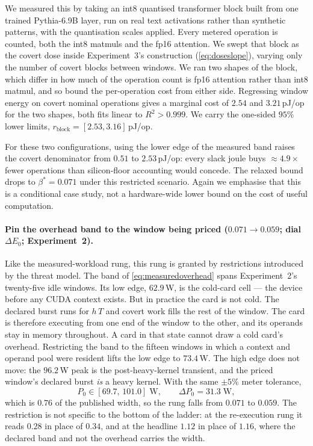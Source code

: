 \documentclass{article}
\theoremstyle{plain}
\theoremstyle{definition}
\theoremstyle{remark}
\begin{document}
We measured this by taking an int8 quantised transformer block built from one trained Pythia-6.9B
layer, run on real text activations rather than synthetic
patterns, with the quantisation scales applied. Every metered operation is
counted, both the int8 matmuls and the fp16 attention. We swept that block
as the covert dose inside Experiment~3's construction
(\cref{eq:doseslope}), varying only the number of covert blocks between
windows. We ran two shapes of the block, which differ in how much of the
operation count is fp16 attention rather than int8 matmul, and so bound the
per-operation cost from either side. Regressing window energy on covert nominal
operations gives a marginal cost of $2.54$ and $3.21$\,pJ/op for the two
shapes, both fits linear to $R^{2} > 0.999$. We carry the one-sided $95\%$ lower limits,
$r_{\mathrm{block}} = [2.53, 3.16]$\,pJ/op.

For these two configurations, using the lower edge of the measured band raises
the covert denominator from $0.51$ to $2.53$\,pJ/op: every slack joule buys
${\approx}4.9\times$ fewer operations than silicon-floor accounting would
concede. The relaxed bound drops to $\beta^{*} = 0.071$ under this restricted
scenario. Again we emphasise that this is a conditional case study, not a hardware-wide lower bound on
the cost of useful computation.

\paragraph{Pin the overhead band to the window being priced
($0.071 \to 0.059$; dial $\Delta E_0$; Experiment~2).}
Like the measured-workload rung, this rung is granted by restrictions introduced by the threat model. The band of \cref{eq:measuredoverhead} spans Experiment~2's
twenty-five idle windows.  Its low edge, $62.9$\,W, is the cold-card cell ---
the device before any CUDA context exists. But in practice the card is not
cold. The declared burst runs for $h\,T$ and covert work fills the rest of the
window. The card is therefore executing from one end of the window to the other,
and its operands stay in memory throughout. A card in that state cannot draw a
cold card's overhead. Restricting
the band to the fifteen windows in which a context and operand pool were
resident lifts the low edge to $73.4$\,W. The high edge does
not move: the $96.2$\,W peak is the post-heavy-kernel transient, and the priced
window's declared burst \emph{is} a heavy kernel. With the same $\pm5\%$ meter
tolerance,
\begin{equation}
	P_0 \in [69.7,\, 101.0]\;\mathrm{W}, \qquad
	\Delta P_0 = 31.3\;\mathrm{W},
	\label{eq:pinnedoverhead}
\end{equation}
which is $0.76$ of the published width, so the rung falls from $0.071$ to
$0.059$. The restriction is not specific to the bottom of the ladder: at the
re-execution rung it reads $0.28$ in place of $0.34$, and at the headline
$1.12$ in place of $1.16$, where the declared band and not the overhead carries
the width.
\end{document}

